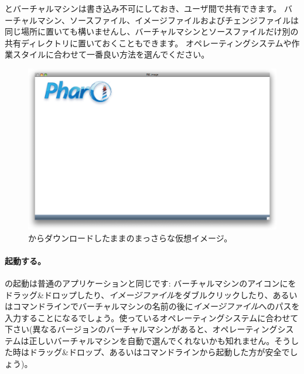 \documentclass[a4paper,10pt,twoside]{book}
\begin{document}
とバーチャルマシンは書き込み不可にしておき、ユーザ間で共有できます。
バーチャルマシン、ソースファイル、イメージファイルおよびチェンジファイルは同じ場所に置いても構いませんし、バーチャルマシンとソースファイルだけ別の共有ディレクトリに置いておくこともできます。
オペレーティングシステムや作業スタイルに合わせて一番良い方法を選んでください。


\begin{figure}[htb]
\centerline {\includegraphics[width=\textwidth]{startup}}
\caption{\pbe からダウンロードしたままのまっさらな仮想イメージ。}
\end{figure}

\paragraph{起動する。} \pharo の起動は普通のアプリケーションと同じです: バーチャルマシンのアイコンにをドラッグ\&ドロップしたり、\emph{イメージファイル}をダブルクリックしたり、あるいはコマンドラインでバーチャルマシンの名前の後に\emph{イメージファイル}へのパスを入力することになるでしょう。使っているオペレーティングシステムに合わせて下さい(異なるバージョンのバーチャルマシンがあると、オペレーティングシステムは正しいバーチャルマシンを自動で選んでくれないかも知れません。そうした時はドラッグ\&ドロップ、あるいはコマンドラインから起動した方が安全でしょう)。
\end{document}
